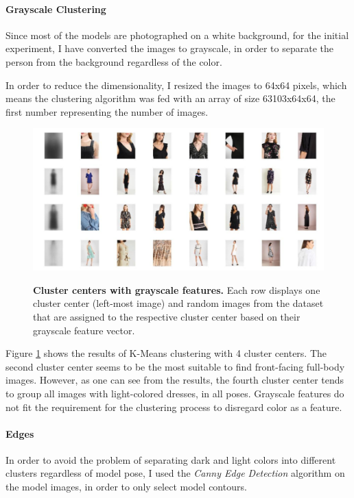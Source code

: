 \documentclass{article}
\begin{document}
\paragraph{Grayscale Clustering}
Since most of the models are photographed on a white background, for the initial experiment, I have converted the images to grayscale, in order to separate the person from the background regardless of the color.

In order to reduce the dimensionality, I resized the images to 64x64 pixels, which means the clustering algorithm was fed with an array of size 63103x64x64, the first number representing the number of images. 

\begin{figure}[h]
\centering
{\includegraphics[width=\linewidth]{clustering/grayscale}}
\caption{\label{fig:cluster_gray} \textbf{Cluster centers with grayscale features.} Each row displays one cluster center (left-most image) and random images from the dataset that are assigned to the respective cluster center based on their grayscale feature vector.}
\end{figure}

Figure \ref{fig:cluster_gray} shows the results of K-Means clustering with 4 cluster centers. The second cluster center seems to be the most suitable to find front-facing full-body images. However, as one can see from the results, the fourth cluster center tends to group all images with light-colored dresses, in all poses. Grayscale features do not fit the requirement for the clustering process to disregard color as a feature.


\paragraph{Edges}
In order to avoid the problem of separating dark and light colors into different clusters regardless of model pose, I used the \textit{Canny Edge Detection} algorithm on the model images, in order to only select model contours.
\end{document}
